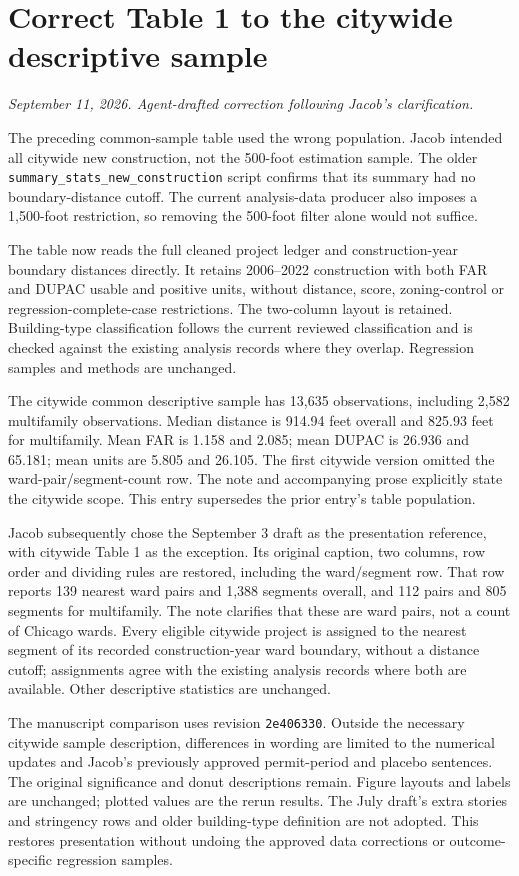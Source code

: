 \section*{Correct Table 1 to the citywide descriptive sample}
\textit{September 11, 2026. Agent-drafted correction following Jacob's clarification.}

The preceding common-sample table used the wrong population. Jacob intended
all citywide new construction, not the 500-foot estimation sample. The older
\texttt{summary\_stats\_new\_construction} script confirms that its summary had
no boundary-distance cutoff. The current analysis-data producer also imposes a
1,500-foot restriction, so removing the 500-foot filter alone would not suffice.

The table now reads the full cleaned project ledger and construction-year
boundary distances directly. It retains 2006--2022 construction with both FAR
and DUPAC usable and positive units, without distance, score, zoning-control or
regression-complete-case restrictions. The two-column layout is retained.
Building-type classification follows the current reviewed classification and is
checked against the existing analysis records where they overlap. Regression
samples and methods are unchanged.

The citywide common descriptive sample has 13,635 observations, including 2,582
multifamily observations. Median distance is 914.94 feet overall and 825.93 feet
for multifamily. Mean FAR is 1.158 and 2.085; mean DUPAC is 26.936 and 65.181;
mean units are 5.805 and 26.105. The first citywide version omitted the
ward-pair/segment-count row. The note and accompanying prose explicitly state
the citywide scope. This entry supersedes the prior entry's table population.

Jacob subsequently chose the September 3 draft as the presentation reference,
with citywide Table 1 as the exception. Its original caption, two columns, row
order and dividing rules are restored, including the ward/segment row. That
row reports 139 nearest ward pairs and 1,388 segments overall, and 112 pairs
and 805 segments for multifamily. The note clarifies that these are ward pairs,
not a count of Chicago wards. Every eligible citywide project is assigned to
the nearest segment of its recorded construction-year ward boundary, without
a distance cutoff; assignments agree with the existing analysis records where
both are available. Other descriptive statistics are unchanged.

The manuscript comparison uses revision \texttt{2e406330}. Outside the necessary
citywide sample description, differences in wording are limited to the numerical
updates and Jacob's previously approved permit-period and placebo sentences.
The original significance and donut descriptions remain. Figure layouts and
labels are unchanged; plotted values are the rerun results. The July draft's
extra stories and stringency rows and older building-type definition are not
adopted. This restores presentation without undoing the approved data corrections
or outcome-specific regression samples.

